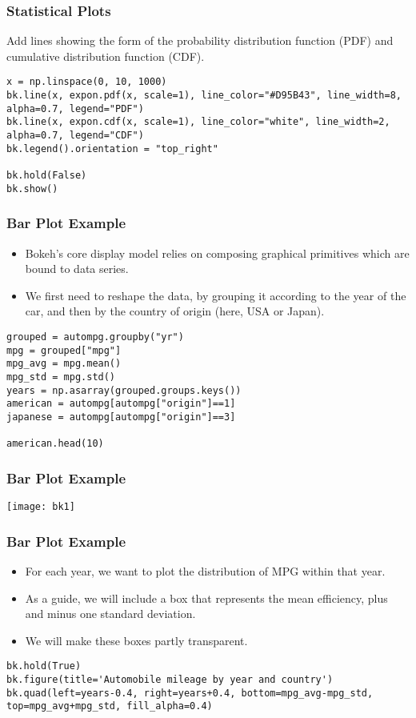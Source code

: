 \begin{frame}[fragile] \frametitle{Statistical Plots}
Add lines showing the form of the probability distribution function (PDF) and cumulative distribution function (CDF).
\begin{lstlisting}
x = np.linspace(0, 10, 1000)
bk.line(x, expon.pdf(x, scale=1), line_color="#D95B43", line_width=8, alpha=0.7, legend="PDF")
bk.line(x, expon.cdf(x, scale=1), line_color="white", line_width=2, alpha=0.7, legend="CDF")
bk.legend().orientation = "top_right"

bk.hold(False)
bk.show()
\end{lstlisting}
\end{frame}

\begin{frame}[fragile] \frametitle{Bar Plot Example}
\begin{itemize}
\item Bokeh's core display model relies on composing graphical primitives which are bound to data series. 
\item We first need to reshape the data, by grouping it according to the year of the car, and then by the country of origin (here, USA or Japan).
\end{itemize}
\begin{lstlisting}
grouped = autompg.groupby("yr")
mpg = grouped["mpg"]
mpg_avg = mpg.mean()
mpg_std = mpg.std()
years = np.asarray(grouped.groups.keys())
american = autompg[autompg["origin"]==1]
japanese = autompg[autompg["origin"]==3]

american.head(10)
\end{lstlisting}
\end{frame}


\begin{frame}[fragile] \frametitle{Bar Plot Example}

\begin{center}
\texttt{[image: bk1]}
\end{center}

\end{frame}

\begin{frame}[fragile] \frametitle{Bar Plot Example}
\begin{itemize}
\item For each year, we want to plot the distribution of MPG within that year. 
\item As a guide, we will include a box that represents the mean efficiency, plus and minus one standard deviation. 
\item We will make these boxes partly transparent.
\end{itemize}
\begin{lstlisting}
bk.hold(True)
bk.figure(title='Automobile mileage by year and country')
bk.quad(left=years-0.4, right=years+0.4, bottom=mpg_avg-mpg_std, top=mpg_avg+mpg_std, fill_alpha=0.4)
\end{lstlisting}
\end{frame}

